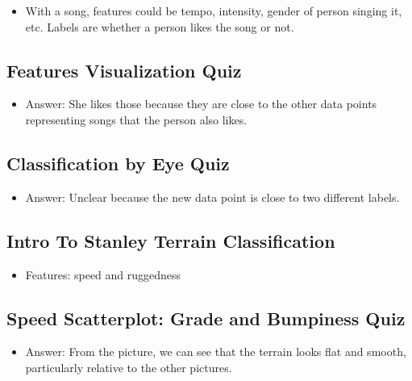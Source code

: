 \documentclass[12pt]{report}
\begin{document}
\begin{itemize}

\item With a song, features could be tempo, intensity, gender of person singing it, etc. Labels are whether a person likes the song or not. 

\end{itemize}

\subsection{Features Visualization Quiz}

\begin{itemize}

\item Answer: She likes those because they are close to the other data points representing songs that the person also likes.

\end{itemize}

\subsection{Classification by Eye Quiz}

\begin{itemize}

\item Answer: Unclear because the new data point is close to two different labels. 

\end{itemize}

\subsection{Intro To Stanley Terrain Classification}

\begin{itemize}

\item Features: speed and ruggedness

\end{itemize}

\subsection{Speed Scatterplot: Grade and Bumpiness Quiz}

\begin{itemize}

\item Answer: From the picture, we can see that the terrain looks flat and smooth, particularly relative to the other pictures. 

\end{itemize}
\end{document}
